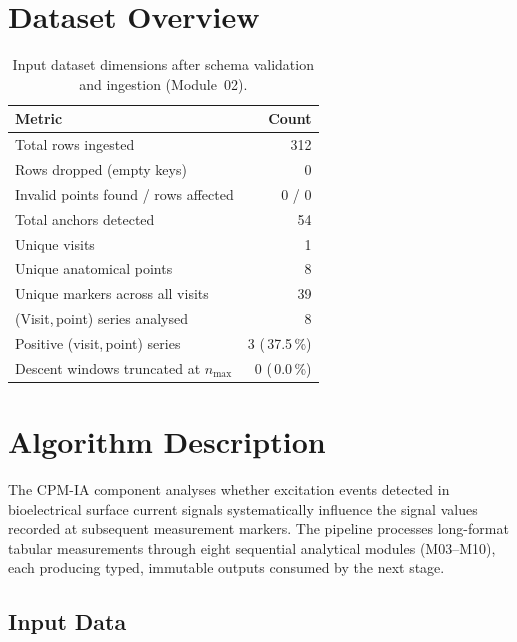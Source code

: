 \documentclass[a4paper,11pt]{article}
\begin{document}
\section{Dataset Overview}

\begin{table}[h!]
\centering
\small
\caption{Input dataset dimensions after schema validation and ingestion (Module~02).}
\begin{tabular}{lr}
\toprule
\textbf{Metric} & \textbf{Count} \\
\midrule
Total rows ingested                        & 312 \\
Rows dropped (empty keys)                  & 0 \\
Invalid points found / rows affected       & 0 / 0 \\
Total anchors detected                     & 54 \\
Unique visits                          & 1 \\
Unique anatomical points               & 8 \\
Unique markers across all visits       & 39 \\
(Visit,\,point) series analysed        & 8 \\
Positive (visit,\,point) series        & 3 (\,37.5\,\%) \\
Descent windows truncated at $n_{\max}$ & 0 (\,0.0\,\%) \\
\bottomrule
\end{tabular}
\end{table}

\section{Algorithm Description}

The CPM-IA component analyses whether excitation events detected in bioelectrical surface
current signals systematically influence the signal values recorded at subsequent measurement
markers. The pipeline processes long-format tabular measurements through eight sequential
analytical modules (M03--M10), each producing typed, immutable outputs consumed by the next
stage.

\subsection{Input Data}
\end{document}
